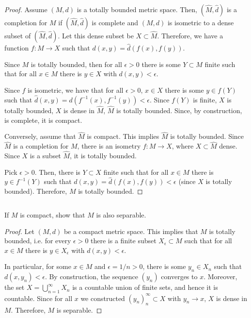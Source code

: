 \begin{proof}
Assume $(M,d)$ is a totally bounded metric space. Then, $(\hat{M}, \hat{d})$ is a completion for $M$ if $(\hat{M}, \hat{d})$ is complete and $(M,d)$ is isometric to a dense subset of $(\hat{M}, \hat{d})$.
Let this dense subset be $X \subset \hat{M}$. Therefore, we have a function $f:M \rightarrow X$ such that $d(x,y) = \hat{d}(f(x), f(y))$.

Since $M$ is totally bounded, then for all $\epsilon > 0$ there is some $Y \subset M$ finite such that for all $x \in M$ there is $y \in X$ with $d(x,y) < \epsilon$.

Since $f$ is isometric, we have that for all $\epsilon>0$, $x \in X$ there is some $y \in f(Y)$ such that $\hat{d}(x,y) = d(f^{-1}(x), f^{-1}(y)) < \epsilon$. Since $f(Y)$ is finite, $X$ is totally bounded, $X$ is dense in $\hat{M}$, $\hat{M}$ is totally bounded. Since, by construction, is complete, it is compact.

\vspace{1em}

Conversely, assume that $\hat{M}$ is compact. This implies $\hat{M}$ is totally bounded. Since $\hat{M}$ is a completion for $M$, there is an isometry $f:M \rightarrow X$, where $X \subset \hat{M}$ dense. Since $X$ is a subset $\hat{M}$, it is totally bounded.

Pick $\epsilon > 0$. Then, there is $Y \subset X$ finite such that for all $x \in M$ there is $y\in f^{-1}(Y)$ such that $d(x,y) = \hat{d}(f(x), f(y)) < \epsilon$ (since $X$ is totally bounded). Therefore, $M$ is totally bounded.

\end{proof}

\subsection{} If $M$ is compact, show that $M$ is also separable. 

\begin{proof}
Let $(M,d)$ be a compact metric space. This implies that $M$ is totally bounded, i.e. for every $\epsilon>0$ there is a finite subset $X_\epsilon \subset M$ such that for all $x \in M$ there is $y \in X_\epsilon$ with $d(x,y) < \epsilon$.

In particular, for some $x \in M$ and $\epsilon = 1/n > 0$, there is some $y_n \in X_n$ such that $d(x, y_n) < \epsilon$. By construction, the sequence $(y_n)$ converges to $x$. Moreover, the set $X = \bigcup_{n=1}^\infty X_n$ is a countable union of finite sets, and hence it is countable. Since for all $x$ we constructed $(y_n)_n^\infty \subset X$ with $y_n \rightarrow x$, $X$ is dense in $M$. Therefore, $M$ is separable.


\end{proof}


